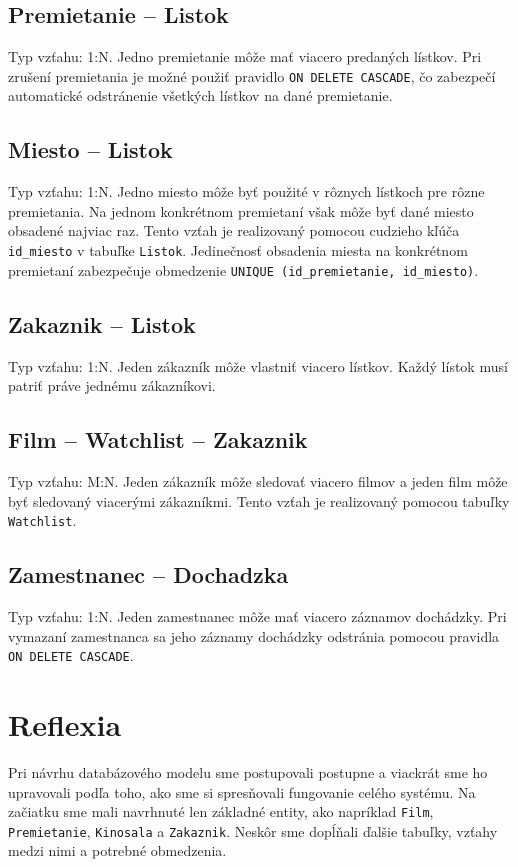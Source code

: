\documentclass[11pt, a4paper]{article}
\begin{document}
\subsection{Premietanie -- Listok}
Typ vzťahu: 1:N. Jedno premietanie môže mať viacero predaných lístkov. Pri zrušení
premietania je možné použiť pravidlo \texttt{ON DELETE CASCADE}, čo zabezpečí automatické
odstránenie všetkých lístkov na dané premietanie.

\subsection{Miesto -- Listok}
Typ vzťahu: 1:N. Jedno miesto môže byť použité v rôznych lístkoch pre rôzne
premietania. Na jednom konkrétnom premietaní však môže byť dané miesto
obsadené najviac raz. Tento vzťah je realizovaný pomocou cudzieho kľúča
\texttt{id\_miesto} v tabuľke \texttt{Listok}. Jedinečnosť obsadenia miesta
na konkrétnom premietaní zabezpečuje obmedzenie
\texttt{UNIQUE (id\_premietanie, id\_miesto)}.

\subsection{Zakaznik -- Listok}
Typ vzťahu: 1:N. Jeden zákazník môže vlastniť viacero lístkov. Každý lístok musí patriť
práve jednému zákazníkovi.

\subsection{Film -- Watchlist -- Zakaznik}
Typ vzťahu: M:N. Jeden zákazník môže sledovať viacero filmov a jeden film môže byť
sledovaný viacerými zákazníkmi. Tento vzťah je realizovaný pomocou tabuľky
\texttt{Watchlist}.

\subsection{Zamestnanec -- Dochadzka}
Typ vzťahu: 1:N. Jeden zamestnanec môže mať viacero záznamov dochádzky. Pri vymazaní
zamestnanca sa jeho záznamy dochádzky odstránia pomocou pravidla \texttt{ON DELETE CASCADE}.

\section{Reflexia}
\label{sec:reflexia}

Pri návrhu databázového modelu sme postupovali postupne a viackrát sme ho upravovali podľa toho,
ako sme si spresňovali fungovanie celého systému. Na začiatku sme mali navrhnuté len základné
entity, ako napríklad \texttt{Film}, \texttt{Premietanie}, \texttt{Kinosala} a \texttt{Zakaznik}.
Neskôr sme dopĺňali ďalšie tabuľky, vzťahy medzi nimi a potrebné obmedzenia.
\end{document}
